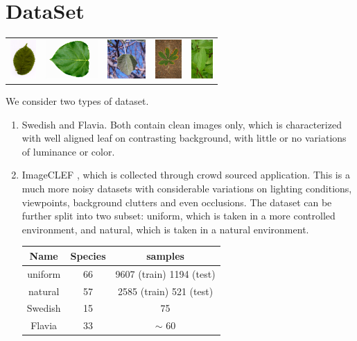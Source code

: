 \documentclass[journal, 10pt]{IEEEtran}
\begin{document}
\section{DataSet}
\label{DataSet}
  \begin{tabular}{c@{}c@{}c@{}c@{}c@{}}
  {\includegraphics[height=4.0em]{swedish1}} &
  {\includegraphics[height=4.0em]{flavia1}} &
  {\includegraphics[height=4.0em]{clef1}} &
  {\includegraphics[height=4.0em]{clef2}} &
  {\includegraphics[height=4.0em]{clef3}}
  \end{tabular}

    We consider two types of dataset.
\begin{enumerate}
  \item Swedish\cite{SwedishLeafDataset} and Flavia\cite{FlaviaDataset}. Both contain clean images only, which is characterized with well aligned leaf on contrasting background, with little or no variations of luminance or color. \\

  \item ImageCLEF \cite{ImageCLEF2013}, which is collected through crowd sourced application. This is a much more noisy datasets with considerable variations on lighting conditions, viewpoints, background clutters and even occlusions. The dataset can be further split into two subset: uniform, which is taken in a more controlled environment, and natural, which is taken in a natural environment.
  \begin{center}
      \begin{tabular}{| c | c | c |}
      \hline
      Name    & Species & samples \\ \hline
      uniform & 66      & 9607 (train)        1194 (test)         \\ \hline
      natural & 57      & 2585 (train)        521  (test)       \\ \hline
      Swedish & 15      & 75        \\ \hline
      Flavia  & 33      & $\sim$ 60 \\ \hline
      \end{tabular}
  \end{center}
\end{enumerate}
\end{document}
